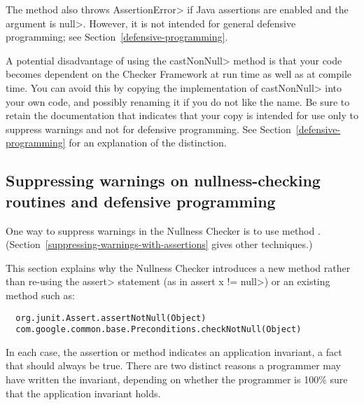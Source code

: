 \begin{enumerate}
  The method also throws \<AssertionError> if Java assertions are enabled and
  the argument is \<null>.  However, it is not intended for general defensive
  programming; see Section~\ref{defensive-programming}.

  A potential disadvantage of using the \<castNonNull> method is that your
  code becomes dependent on the Checker Framework at run time as well as at
  compile time.  You can avoid this by copying the implementation of
  \<castNonNull> into your own code, and possibly renaming it if you do not
  like the name.  Be sure to retain the documentation that indicates that
  your copy is intended for use only to suppress warnings and not for
  defensive programming.  See Section~\ref{defensive-programming} for an
  explanation of the distinction.

\end{enumerate}


\subsection{Suppressing warnings on nullness-checking routines and defensive programming\label{defensive-programming}}

% 


One way to suppress warnings in the Nullness Checker is to use
method .
(Section~\ref{suppressing-warnings-with-assertions} gives other techniques.)

This section explains why the Nullness Checker introduces a new method
rather than re-using the \<assert> statement (as in
\<assert x != null>) or an existing method such as:

\begin{Verbatim}
  org.junit.Assert.assertNotNull(Object)
  com.google.common.base.Preconditions.checkNotNull(Object)
\end{Verbatim}

In each case, the assertion or method indicates an application invariant, a
fact that should always be true.  There are two distinct reasons a
programmer may have written the invariant, depending on whether the
programmer is 100\% sure that the application invariant holds.

